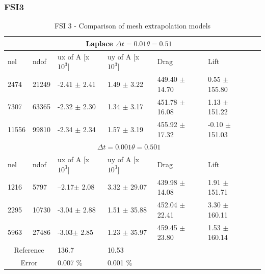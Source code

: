 \newpage
\subsubsection{FSI3}

\begin{table}[h!]
\centering
\caption{FSI 3 - Comparison of mesh extrapolation models}
\label{my-label}
\begin{tabular}{ |p{1cm}||p{1cm}|p{2.5cm}|p{2.5cm}|p{2.7cm}|p{2.7cm}|p{1.2cm}|}
 \hline
  \multicolumn{6}{|c|}{Laplace \hspace{2mm} $\Delta t = 0.01 \theta = 0.51$} \\
   \hline
nel & ndof & ux of A [x $10^{3}$]  &uy of A [x $10^{3}$]& Drag  & Lift \\
 \hline
 2474    & 21249  & -2.41      $\pm$ 2.41 & 1.49       $\pm$ 3.22 & 449.40       $\pm$ 14.70 & 0.55       $\pm$ 155.80  \\
 7307    & 63365  & -2.32       $\pm$ 2.30 & 1.34       $\pm$ 3.17 & 451.78       $\pm$ 16.08 & 1.13       $\pm$ 151.22  \\
 11556   & 99810  & -2.34       $\pm$ 2.34 & 1.57       $\pm$ 3.19 & 455.92       $\pm$ 17.32 & -0.10       $\pm$ 151.03 \\
 \hline
  \multicolumn{6}{|c|}{$\Delta t = 0.001 \theta = 0.501$} \\
   \hline
 nel & ndof & ux of A [x $10^{3}$]  &uy of A [x $10^{3}$]& Drag  & Lift \\
    \hline
1216 &5797& --2.17$\pm$  2.08 &     3.32     $\pm$  29.07 &439.98 $\pm$  14.08  &  1.91 $\pm$  151.71\\
2295 &10730& -3.04 $\pm$  2.88 &  1.51  $\pm$  35.88 & 452.04  $\pm$  22.41 &  3.30      $\pm$  160.11 \\
5963 &27486 & -3.03$\pm$  2.85 &  1.23 $\pm$  35.97  & 459.45  $\pm$  23.80 &  1.53  $\pm$  160.14 \\
 \hline
  \multicolumn{2}{|c|}{Reference}  & 136.7   & 10.53 & &\\
   \hline
    \multicolumn{2}{|c|}{Error}  & 0.007 \%   & 0.001 \% & &\\
   \hline
\end{tabular}
\end{table}

